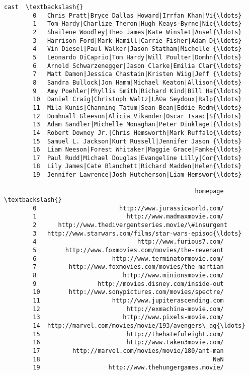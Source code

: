 \documentclass[11pt]{article}
\begin{document}
\begin{Verbatim}[commandchars=\\\{\}]
                                                         cast  \textbackslash{}
        0   Chris Pratt|Bryce Dallas Howard|Irrfan Khan|Vi{\ldots}   
        1   Tom Hardy|Charlize Theron|Hugh Keays-Byrne|Nic{\ldots}   
        2   Shailene Woodley|Theo James|Kate Winslet|Ansel{\ldots}   
        3   Harrison Ford|Mark Hamill|Carrie Fisher|Adam D{\ldots}   
        4   Vin Diesel|Paul Walker|Jason Statham|Michelle {\ldots}   
        5   Leonardo DiCaprio|Tom Hardy|Will Poulter|Domhn{\ldots}   
        6   Arnold Schwarzenegger|Jason Clarke|Emilia Clar{\ldots}   
        7   Matt Damon|Jessica Chastain|Kristen Wiig|Jeff {\ldots}   
        8   Sandra Bullock|Jon Hamm|Michael Keaton|Allison{\ldots}   
        9   Amy Poehler|Phyllis Smith|Richard Kind|Bill Ha{\ldots}   
        10  Daniel Craig|Christoph Waltz|LÃ©a Seydoux|Ralp{\ldots}   
        11  Mila Kunis|Channing Tatum|Sean Bean|Eddie Redm{\ldots}   
        12  Domhnall Gleeson|Alicia Vikander|Oscar Isaac|S{\ldots}   
        13  Adam Sandler|Michelle Monaghan|Peter Dinklage|{\ldots}   
        14  Robert Downey Jr.|Chris Hemsworth|Mark Ruffalo{\ldots}   
        15  Samuel L. Jackson|Kurt Russell|Jennifer Jason {\ldots}   
        16  Liam Neeson|Forest Whitaker|Maggie Grace|Famke{\ldots}   
        17  Paul Rudd|Michael Douglas|Evangeline Lilly|Cor{\ldots}   
        18  Lily James|Cate Blanchett|Richard Madden|Helen{\ldots}   
        19  Jennifer Lawrence|Josh Hutcherson|Liam Hemswor{\ldots}   
        
                                                     homepage  \textbackslash{}
        0                       http://www.jurassicworld.com/   
        1                         http://www.madmaxmovie.com/   
        2      http://www.thedivergentseries.movie/\#insurgent   
        3   http://www.starwars.com/films/star-wars-episod{\ldots}   
        4                            http://www.furious7.com/   
        5        http://www.foxmovies.com/movies/the-revenant   
        6                     http://www.terminatormovie.com/   
        7         http://www.foxmovies.com/movies/the-martian   
        8                        http://www.minionsmovie.com/   
        9                 http://movies.disney.com/inside-out   
        10        http://www.sonypictures.com/movies/spectre/   
        11                    http://www.jupiterascending.com   
        12                        http://exmachina-movie.com/   
        13                       http://www.pixels-movie.com/   
        14  http://marvel.com/movies/movie/193/avengers\_ag{\ldots}   
        15                        http://thehatefuleight.com/   
        16                        http://www.taken3movie.com/   
        17         http://marvel.com/movies/movie/180/ant-man   
        18                                                NaN   
        19                   http://www.thehungergames.movie/   
        

\end{Verbatim}
\end{document}
